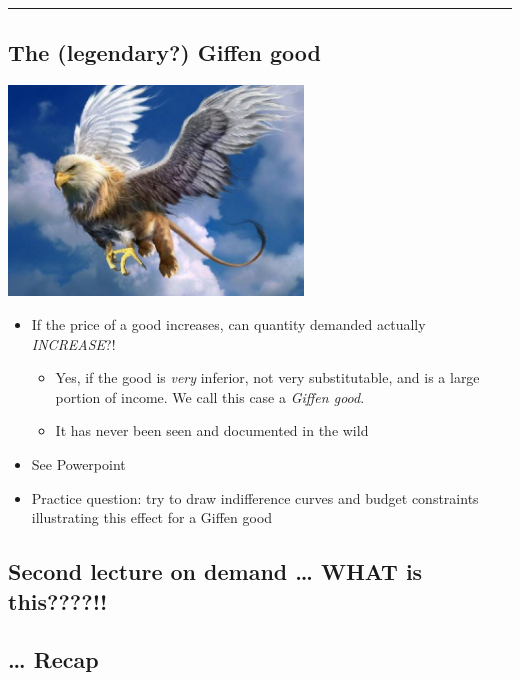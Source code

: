 \documentclass[]{article}
\providecommand{\tightlist}{%
  \setlength{\itemsep}{0pt}\setlength{\parskip}{0pt}}
\begin{document}
\begin{center}\rule{0.5\linewidth}{\linethickness}\end{center}

\hypertarget{the-legendary-giffen-good}{%
\subsection{The (legendary?) Giffen
good}\label{the-legendary-giffen-good}}

\includegraphics[height=2.2in]{picsfigs/griffin.jpg}

\begin{itemize}
\item
  If the price of a good increases, can quantity demanded actually
  \emph{INCREASE}?!

  \begin{itemize}
  \tightlist
  \item
    Yes, if the good is \emph{very} inferior, not very substitutable,
    and is a large portion of income. We call this case a \emph{Giffen
    good}.
  \item
    It has never been seen and documented in the wild\\
  \end{itemize}
\item
  See Powerpoint
\item
  Practice question: try to draw indifference curves and budget
  constraints illustrating this effect for a Giffen good
\end{itemize}

\hypertarget{second-lecture-on-demand-what-is-this}{%
\subsection{Second lecture on demand \ldots{} WHAT is
this????!!}\label{second-lecture-on-demand-what-is-this}}

\hypertarget{recap}{%
\subsection{\ldots{} Recap}\label{recap}}
\end{document}
